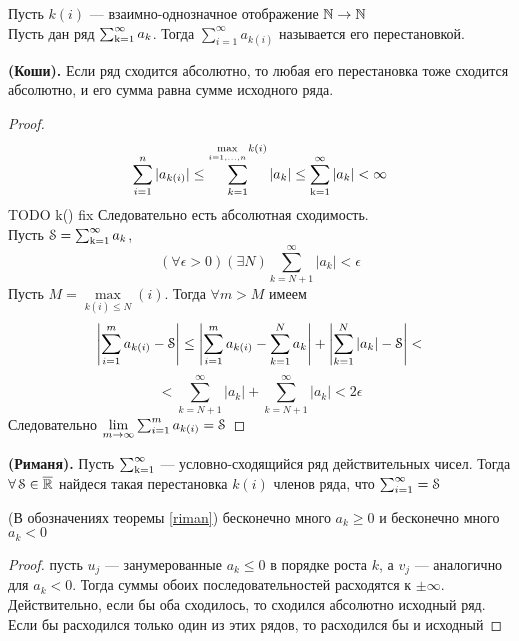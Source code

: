 \begin{deff}
Пусть $k(i)$ --- взаимно-однозначное отображение $\operatorname{\mathbb{N}} \to \operatorname{\mathbb{N}}$\\
Пусть дан ряд $\operatorname{\sum_{k=1}^{\infty}} a_k$. Тогда $\sum_{i=1}^{\infty} a_{k(i)}$ называется его перестановкой.
\end{deff}
\begin{thm}
\textbf{(Коши).}
Если ряд сходится абсолютно, то любая его перестановка тоже сходится абсолютно, и его сумма равна сумме исходного ряда.
\end{thm}
\begin{proof}
$$\sum_{i=1}^{n}|a_{k(i)}| \le \sum_{k=1}^{\max\limits_{i=1,\ldots,n} k(i)} |a_k| \le \operatorname{\sum_{k=1}^{\infty}} |a_k| < \infty$$
TODO k() fix
Следовательно есть абсолютная сходимость.\\
Пусть $\operatorname{\EuScript{S}} = \operatorname{\sum_{k=1}^{\infty}} a_k$,
$$(\forall \epsilon>0) (\exists N) \sum\limits_{k=N+1}^{\infty} |a_k| < \epsilon$$
Пусть $M = \max\limits_{k(i)\le N}(i)$. Тогда $\forall m > M$ имеем
$$\left|\sum_{i=1}^{m} a_{k(i)} - \operatorname{\EuScript{S}} \right| \le \left| \sum_{i=1}^{m} a_{k(i)} - \sum_{k=1}^{N} a_k \right| + \left|\sum_{k=1}^{N}|a_k| - \operatorname{\EuScript{S}} \right| <$$
 $$ < \sum_{k=N+1}^{\infty}|a_k| + \sum_{k=N+1}^{\infty}|a_k| < 2\epsilon$$
 Следовательно $\lim\limits_{m\to\infty} \sum_{i=1}^m a_{k(i)} = \operatorname{\EuScript{S}}$
\end{proof}
\begin{thm}\label{riman}
\textbf{(Риманя).} Пусть $\operatorname{\sum_{k=1}^{\infty}}$ --- условно-сходящийся ряд действительных чисел. Тогда $\forall \operatorname{\EuScript{S}} \in \overline{\operatorname{\mathbb{R}}}$
найдеся такая перестановка $k(i)$ членов ряда, что $\sum_{i=1}^{\infty}=\operatorname{\EuScript{S}}$
\end{thm}
\begin{sts}
(В обозначениях теоремы \ref{riman}) бесконечно много $a_k \ge 0$ и бесконечно много $a_k < 0$
\end{sts}
\begin{proof}
пусть $u_j$ --- занумерованные $a_k \le 0$ в порядке роста $k$, а $v_j$ --- аналогично для $a_k < 0$.
Тогда суммы обоих последовательностей расходятся к $\pm\infty$.
Действительно, если бы оба сходилось, то сходился абсолютно исходный ряд. Если бы расходился только один из этих рядов, то расходился бы и исходный
\end{proof}
